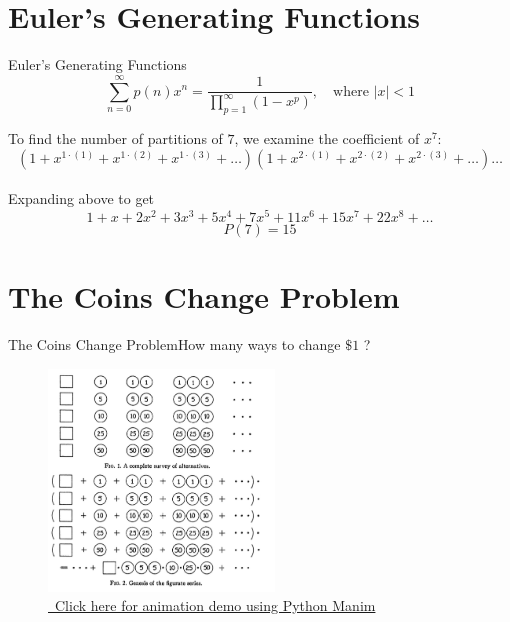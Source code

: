 \documentclass{beamer}
\begin{document}
    \section{Euler’s Generating Functions}
    \begin{frame}{Euler’s Generating Functions}
        \begin{equation}
            \sum_{n=0}^{\infty} p(n) x^n = \frac{1}{\prod_{p=1}^{\infty} (1-x^p)}, \quad \text{where } |x| < 1
        \end{equation}

        \begin{example}
            To find the number of partitions of $7$, we examine the coefficient of $x^7$:
            \begin{equation}
                (1 + x^{1\cdot(1)} + x^{1\cdot(2)} + x^{1\cdot(3)} + \ldots )(1 + x^{2\cdot(1)} + x^{2\cdot(2)} + x^{2\cdot(3)} + \ldots ) \ldots
            \end{equation} \\
            Expanding above to get
            \begin{equation}
                1 + x + 2x^2 + 3x^3 + 5x^4 + 7x^5 + 11x^6 + 15x^7 + 22x^8 + \ldots
            \end{equation}
            \begin{equation}
                P(7) = 15
            \end{equation}
        \end{example}
    \end{frame}

    \section{The Coins Change Problem}
    \begin{frame}{The Coins Change Problem}{How many ways to change $\$1$ ?}
        \begin{figure}[h!]
        \centering
            \includegraphics[width=6cm]{images/coins-change.jpg}
            \caption{\href{https://youtu.be/PmR1eRswj3A}{\small\ Click here for animation demo using Python Manim}}
        \end{figure}
    \end{frame}
\end{document}
